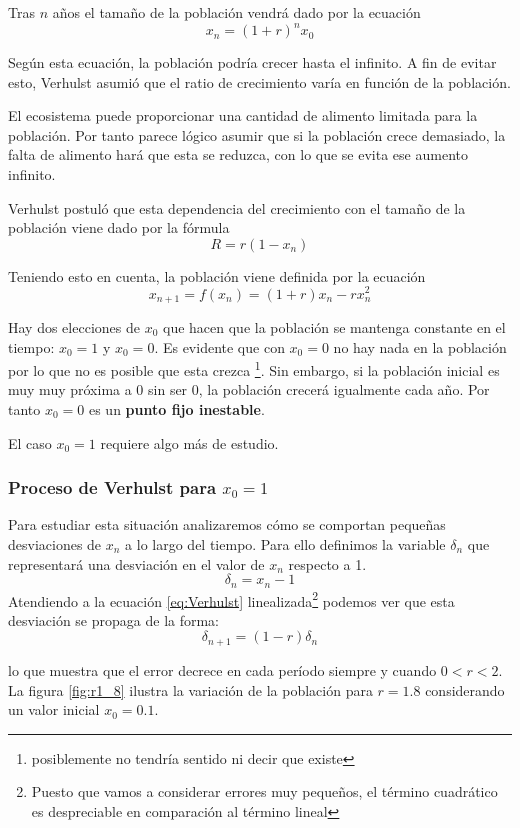 Tras $n$ años el tamaño de la población vendrá dado por la ecuación
\[x_n = (1+r)^nx_0\]

Según esta ecuación, la población podría crecer hasta el infinito. A fin de evitar esto, Verhulst asumió que el ratio de crecimiento varía en función de la población.

El ecosistema puede proporcionar una cantidad de alimento limitada para la población. Por tanto parece lógico asumir que si la población crece demasiado, la falta de alimento hará que esta se reduzca, con lo que se evita ese aumento infinito.

Verhulst postuló que esta dependencia del crecimiento con el tamaño de la población viene dado por la fórmula
\[R=r(1-x_n)\]

Teniendo esto en cuenta, la población viene definida por la ecuación
\begin{equation}\label{eq:Verhulst}
x_{n+1} = f(x_n) = (1+r)x_n - rx_n^2
\end{equation}

Hay dos elecciones de $x_0$ que hacen que la población se mantenga constante en el tiempo: $x_0=1$ y $x_0=0$. Es evidente que con $x_0=0$ no hay nada en la población por lo que no es posible que esta crezca \footnote{posiblemente no tendría sentido ni decir que existe}. Sin embargo, si la población inicial es muy muy próxima a 0 sin ser 0, la población crecerá igualmente cada año. Por tanto $x_0=0$ es un \textbf{punto fijo inestable}.

El caso $x_0=1$ requiere algo más de estudio.

\subsubsection{Proceso de Verhulst para $x_0=1$}
Para estudiar esta situación analizaremos cómo se comportan pequeñas desviaciones de $x_n$ a lo largo del tiempo. Para ello definimos la variable $δ_n$ que representará una desviación en el valor de $x_n$ respecto a 1.
\[δ_n = x_n-1\]
Atendiendo a la ecuación \eqref{eq:Verhulst} linealizada\footnote{Puesto que vamos a considerar errores muy pequeños, el término cuadrático es despreciable en comparación al término lineal} podemos ver que esta desviación se propaga de la forma:
\[δ_{n+1} = (1-r)δ_n\]

lo que muestra que el error decrece en cada período siempre y cuando $0<r<2$. La figura \ref{fig:r1_8} ilustra la variación de la población para $r=1.8$ considerando un valor inicial $x_0=0.1$.

